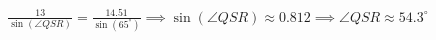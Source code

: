 \documentclass[preview]{standalone}
\begin{document}
\begin{align*}
\frac{13}{\sin(\angle QSR)} = \frac{14.51}{\sin(65^\circ)} \implies \sin(\angle QSR) \approx 0.812 \implies \angle QSR \approx 54.3^\circ
\end{align*}
\end{document}
